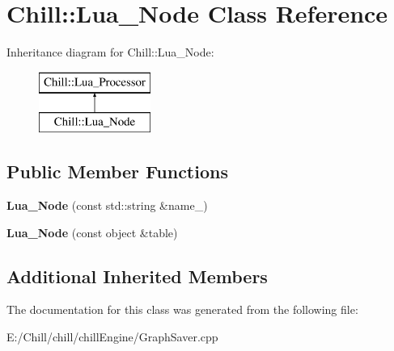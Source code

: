 \hypertarget{class_chill_1_1_lua___node}{}\section{Chill\+:\+:Lua\+\_\+\+Node Class Reference}
\label{class_chill_1_1_lua___node}
Inheritance diagram for Chill\+:\+:Lua\+\_\+\+Node\+:\begin{figure}[H]
\begin{center}
\leavevmode
\includegraphics[height=2.000000cm]{class_chill_1_1_lua___node}
\end{center}
\end{figure}
\subsection*{Public Member Functions}
\begin{DoxyCompactItemize}
\item 
\mbox{\label{class_chill_1_1_lua___node_afccc165b818a958f872590c5294d613a}} 
{\bfseries Lua\+\_\+\+Node} (const std\+::string \&name\+\_\+)
\item 
\mbox{\label{class_chill_1_1_lua___node_ac890079e18a78070435fa9eb76f6d4ad}} 
{\bfseries Lua\+\_\+\+Node} (const object \&table)
\end{DoxyCompactItemize}
\subsection*{Additional Inherited Members}


The documentation for this class was generated from the following file\+:\begin{DoxyCompactItemize}
\item 
E\+:/\+Chill/chill/chill\+Engine/Graph\+Saver.\+cpp\end{DoxyCompactItemize}
